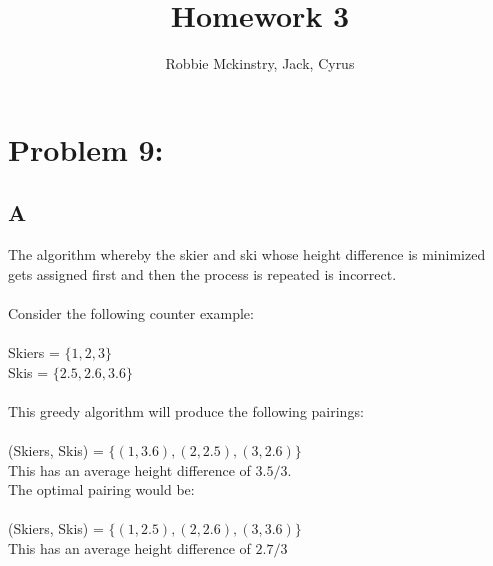 \documentclass{article}
\begin{document}
\title{Homework 3}
\author{Robbie Mckinstry, Jack, Cyrus}
\renewcommand{\today}{4 September 2016}
\maketitle

\section*{Problem 9:}
\subsection*{A}

The algorithm whereby the skier and ski whose height difference
is minimized gets assigned first and then the process is repeated
is incorrect.\\\\
Consider the following counter example:\\\\
Skiers = $\{1,2,3\}$\\
Skis = $\{2.5, 2.6, 3.6\}$\\\\
This greedy algorithm will produce the following pairings:\\\\
(Skiers, Skis) = $\{(1,3.6),(2,2.5),(3,2.6)\}$\\
This has an average height difference of $3.5/3$.\\
The optimal pairing would be:\\\\
(Skiers, Skis) = $\{(1,2.5),(2,2.6),(3,3.6)\}$\\
This has an average height difference of $2.7/3$
\end{document}

